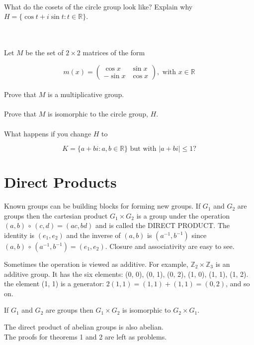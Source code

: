 \documentclass[12pt]{book}
\theoremstyle{definition}
\def\Z{\mathbb{Z}}
\begin{document}
~\\
What do the cosets of the circle group look like?
Explain why $ H=\{\cos t+i\sin t : t\in \mathbb{R}\}. $

~\\
~\\
Let $ M $ be the set of $ 2\times 2 $ matrices of the form 

$$m(x)=
\begin{pmatrix} 
\cos x & \sin x \\
-\sin x & \cos x
\end{pmatrix}, \text{ with } x\in \mathbb{R}
$$
~\\
Prove that $ M $ is a multiplicative group.\\
~\\
Prove that $ M $ is isomorphic to the circle group, $ H $.
~\\
~\\
What happens if you change $ H $ to

$$ K=\{a+bi: a,b\in \mathbb{R}\} \text{ but with } |a+bi|\leq 1?$$ 


\section{Direct Products}
Known groups can be building blocks for forming new groups.  If $G_1$ and $G_2$ are groups then the cartesian product $G_1 \times G_2$ is a group under the operation $(a,b)\,\circ\,(c,d)=(ac,bd)$ and is called the DIRECT PRODUCT.  The identity is $(e_1,e_2)$ and the inverse of $(a,b)$ is $(a^{-1},b^{-1})$ since $(a,b)\,\circ\,(a^{-1},b^{-1})=(e_1,e_2)$.  Closure and associativity are easy to see.

Sometimes the operation is viewed as additive.  For example, $\Z_2\times \Z_3$ is an additive group.  It has the six elements: (0, 0), (0, 1), (0, 2), (1, 0), (1, 1), (1, 2).  the element (1, 1) is a generator: $2(1, 1) = (1, 1)+(1, 1)= (0, 2)$, and so on.
\begin{tctheorem}{}{}
 If $ G_1 $ and $ G_2 $ are groups then $ G_1\times G_2 $ is isomorphic to $ G_2\times G_1 $.
\end{tctheorem} 

\begin{tctheorem}{}{}
The direct product of abelian groups is also abelian.\\
The proofs for theorems 1 and 2 are left as problems.
\end{tctheorem}
\end{document}
